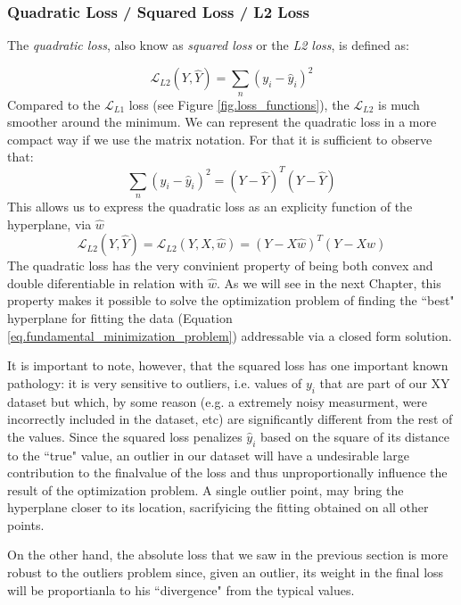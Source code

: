 \subsubsection{Quadratic Loss / Squared Loss / L2 Loss}
The \emph{quadratic loss}, also know as \emph{squared loss} or the \emph{L2 loss}, is defined as:

\begin{equation}
\mathcal{L}_{L2}(Y, \hat{Y}) = \sum_n {(y_i - \hat{y}_i)}^2
\end{equation}
Compared to the $\mathcal{L}_{L1}$ loss (see Figure \ref{fig.loss_functions}), the $\mathcal{L}_{L2}$ is much smoother around the minimum. We can represent the quadratic loss in a more compact way if we use the matrix notation. For that it is sufficient to observe that:
\begin{equation}
\sum_n {(y_i - \hat{y}_i)}^2 = (Y - \hat{Y})^T(Y - \hat{Y})
\end{equation}
This allows us to express the quadratic loss as an explicity function of the hyperplane, via $\hat{w}$
\begin{equation}
\mathcal{L}_{L2}(Y, \hat{Y}) = \mathcal{L}_{L2}(Y, X, \hat{w}) = (Y - X \hat{w})^T(Y - X \hat{w}) 
\end{equation}
The quadratic loss has the very convinient property of being both convex and double diferentiable in relation with $\hat{w}$. As we will see in the next Chapter, this property makes it possible to solve the optimization problem of finding the ``best" hyperplane for fitting the data (Equation \ref{eq.fundamental_minimization_problem}) addressable via a closed form solution. 

It is important to note, however, that the squared loss has one important known pathology: it is very sensitive to outliers, i.e. values of $y_i$ that are part of our XY dataset but which, by some reason (e.g. a extremely noisy measurment, were incorrectly included in the dataset, etc) are significantly different from the rest of the values. Since the squared loss penalizes $\hat{y}_i$ based on the square of its distance to the ``true"  value, an outlier in our dataset will have a undesirable large contribution to the finalvalue of the loss and thus unproportionally influence the result of the optimization problem. A single outlier point, may bring the hyperplane closer to its location, sacrifyicing the fitting obtained on all other points. 

On the other hand, the absolute loss that we saw in the previous section is more robust to the outliers problem since, given an outlier, its weight in the final loss will be proportianla to his ``divergence" from the typical values. 

